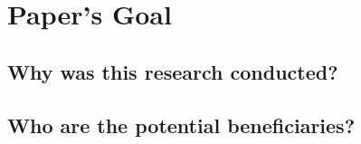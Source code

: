 \section{Paper's Goal}

\subsection{Why was this research conducted?}

\subsection{Who are the potential beneficiaries?}




